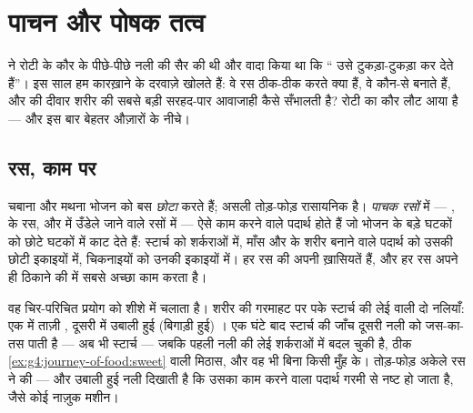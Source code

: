 \chapter{पाचन और पोषक तत्व}\label{ch:g7:digestion-and-nutrients}

 ने रोटी के कौर के पीछे-पीछे नली की सैर की
थी और वादा किया था कि `` उसे टुकड़ा-टुकड़ा कर देते हैं''। इस साल
हम कारख़ाने के दरवाज़े खोलते हैं: वे रस ठीक-ठीक करते क्या हैं, वे
कौन-से  बनाते हैं, और  की दीवार शरीर की सबसे बड़ी
सरहद-पार आवाजाही कैसे सँभालती है? रोटी का कौर लौट आया है --- और इस बार
बेहतर औज़ारों के नीचे।

\section{रस, काम पर}

\begin{proposition}[पाचन रासायनिक तोड़-फोड़ है]\label{prop:g7:digestion-and-nutrients:chemical}
चबाना और मथना भोजन को बस \emph{छोटा} करते हैं; असली तोड़-फोड़ रासायनिक
है। \emph{पाचक रसों} में --- ,  के रस, और  में उँडेले जाने वाले रसों में --- ऐसे काम करने वाले पदार्थ होते हैं
जो भोजन के बड़े घटकों को छोटे घटकों में काट देते हैं: स्टार्च को
शर्कराओं में, माँस और  के शरीर बनाने वाले पदार्थ को उसकी छोटी
इकाइयों में, चिकनाइयों को उनकी इकाइयों में। हर रस की अपनी ख़ासियतें हैं,
और हर रस अपने ही ठिकाने की  में सबसे अच्छा काम करता है।
\end{proposition}
\admitted

\begin{example}[मेज़ पर उतारा हुआ रूप]\label{ex:g7:digestion-and-nutrients:bench}
वह चिर-परिचित प्रयोग  को शीशे में चलाता है। शरीर की गरमाहट पर पके
स्टार्च की लेई वाली दो नलियाँ: एक में ताज़ी , दूसरी में उबाली हुई
(बिगाड़ी हुई) । एक घंटे बाद स्टार्च की जाँच दूसरी नली को जस-का-तस
पाती है --- अब भी स्टार्च --- जबकि पहली नली की लेई शर्कराओं में बदल
चुकी है, ठीक \cref{ex:g4:journey-of-food:sweet} वाली मिठास, और वह भी
बिना किसी मुँह के। तोड़-फोड़ अकेले रस ने की --- और उबाली हुई नली दिखाती
है कि उसका काम करने वाला पदार्थ गरमी से नष्ट हो जाता है, जैसे कोई नाज़ुक
मशीन।
\end{example}

